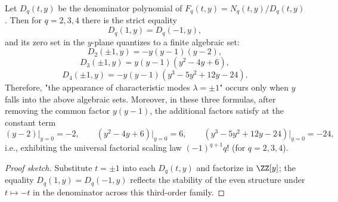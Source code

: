 \begin{conclusion}[Zero locus on the \texorpdfstring{$t=\pm1$}{t=±1} lines: algebraic-curve quantization of the weight parameter]\label{con:xi-terminal-zq-line-tpm1-zeros}
Let \(D_q(t,y)\) be the denominator polynomial of \(F_q(t,y)=N_q(t,y)/D_q(t,y)\).
Then for \(q=2,3,4\) there is the strict equality
\[
D_q(1,y)=D_q(-1,y),
\]
and its zero set in the \(y\)-plane quantizes to a finite algebraic set:
\[
D_2(\pm1,y)=-y(y-1)(y-2),
\]
\[
D_3(\pm1,y)=y(y-1)(y^2-4y+6),
\]
\[
D_4(\pm1,y)=-y(y-1)(y^3-5y^2+12y-24).
\]
Therefore, "the appearance of characteristic modes \(\lambda=\pm1\)" occurs only when \(y\) falls into the above algebraic sets.
Moreover, in these three formulas, after removing the common factor \(y(y-1)\), the additional factors satisfy at the constant term
\[
(y-2)\big|_{y=0}=-2,\qquad
(y^2-4y+6)\big|_{y=0}=6,\qquad
(y^3-5y^2+12y-24)\big|_{y=0}=-24,
\]
i.e., exhibiting the universal factorial scaling law \(({-}1)^{q+1}q!\) (for \(q=2,3,4\)).
\end{conclusion}
\begin{proof}[Proof sketch]
Substitute \(t=\pm1\) into each \(D_q(t,y)\) and factorize in \(\ZZ[y]\);
the equality \(D_q(1,y)=D_q(-1,y)\) reflects the stability of the even structure under \(t\mapsto -t\) in the denominator across this third-order family.
\end{proof}

